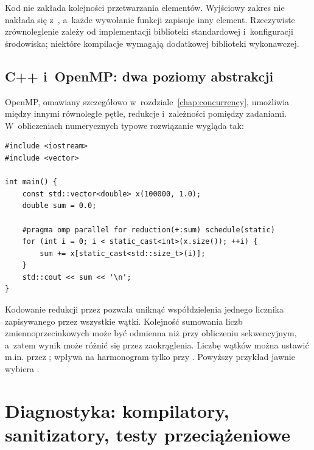 Kod nie zakłada kolejności przetwarzania elementów. Wyjściowy zakres
 nie nakłada się z~, a~każde wywołanie funkcji
zapisuje inny element. Rzeczywiste zrównoleglenie zależy od
implementacji biblioteki standardowej i~konfiguracji środowiska;
niektóre kompilacje wymagają dodatkowej biblioteki wykonawczej.

\subsection{C++ i~OpenMP: dwa poziomy abstrakcji}

OpenMP, omawiany szczegółowo w~rozdziale~\ref{chap:concurrency}, umożliwia między innymi
równoległe pętle, redukcje i~zależności pomiędzy zadaniami.
W~obliczeniach numerycznych typowe rozwiązanie wygląda tak:

\begin{lstlisting}[caption={Wektorowa redukcja z OpenMP; wymagane -fopenmp.}]
#include <iostream>
#include <vector>

int main() {
    const std::vector<double> x(100000, 1.0);
    double sum = 0.0;

    #pragma omp parallel for reduction(+:sum) schedule(static)
    for (int i = 0; i < static_cast<int>(x.size()); ++i) {
        sum += x[static_cast<std::size_t>(i)];
    }
    std::cout << sum << '\n';
}
\end{lstlisting}

Kodowanie redukcji przez  pozwala uniknąć współdzielenia
jednego licznika zapisywanego przez wszystkie wątki. Kolejność
sumowania liczb zmiennoprzecinkowych może być odmienna niż przy
obliczeniu sekwencyjnym, a~zatem wynik może różnić się przez
zaokrąglenia. Liczbę wątków można ustawić m.in. przez
;  wpływa na harmonogram
tylko przy . Powyższy przykład jawnie
wybiera .


\section{Diagnostyka: kompilatory, sanitizatory, testy przeciążeniowe}
\label{sec:cpp16-testing}

